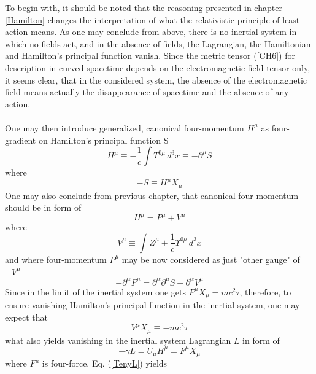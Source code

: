 \documentclass[aps,prx,preprint,groupedaddress,showkeys]{revtex4-2}
\begin{document}
To begin with, it should be noted that the reasoning presented in chapter \ref{Hamilton} changes the interpretation of what the relativistic principle of least action means. As one may conclude from above, there is no inertial system in which no fields act, and in the absence of fields, the Lagrangian, the Hamiltonian and Hamilton's principal function vanish. Since the metric tensor (\ref{CH6}) for description in curved spacetime depends on the electromagnetic field tensor only, it seems clear, that in the considered system, the absence of the electromagnetic field means actually the disappearance of spacetime and the absence of any action.\\
~\\
One may then introduce generalized, canonical four-momentum $H^{\mu}$ as four-gradient on Hamilton's principal function S
\begin{equation} \label{Q2}
H^{\mu} \equiv - \frac{1}{c} \int T^{0 \mu} \, d^3 x \equiv -\partial^{\mu} S
\end{equation}
where 
\begin{equation} \label{Q2a}
- S \equiv H^{\mu}X_{\mu}
\end{equation}
One may also conclude from previous chapter, that canonical four-momentum should be in form of
\begin{equation} \label{Q5}
H^{\mu} = P^{\mu} + V^{\mu} 
\end{equation}
where 
\begin{equation} \label{CD1}
V^{\mu} \equiv \int Z^{\mu} + \frac{1}{c} \Upsilon^{0 \mu} \, d^3 x
\end{equation}
and where four-momentum $P^{\mu}$ may be now considered as just "other gauge" of  $-V^{\mu}$ 
\begin{equation} \label{Q5b}
- \partial^{\alpha} P^{\mu} = \partial^{\alpha} \partial^{\mu} S + \partial^{\alpha} V^{\mu}
\end{equation}
Since in the limit of the inertial system one gets $P^{\mu} X_{\mu} = mc^2\tau$, therefore, to ensure vanishing Hamilton's principal function in the inertial system, one may expect that
\begin{equation} \label{Q1}
V^{\mu} X_{\mu} \equiv - mc^2 \tau 
\end{equation}
what also yields vanishing in the inertial system Lagrangian $L$ in form of
\begin{equation} \label{Q4}
- \gamma L = U_{\mu} H^{\mu}= F^{\mu} X_{\mu} 
\end{equation}
where $F^{\mu}$ is four-force. Eq. (\ref{TenyL}) yields
\end{document}
